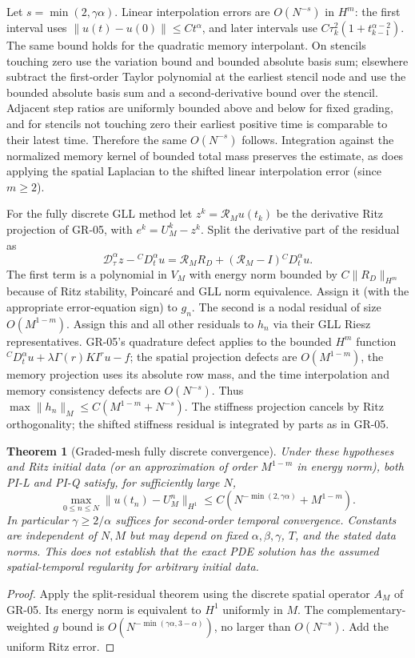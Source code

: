 \documentclass[11pt,a4paper]{article}
\newtheorem{theorem}{Theorem}
\newcommand{\norm}[1]{\lVert#1\rVert}
\newcommand{\D}{\mathcal D_\tau^\alpha}
\begin{document}
Let $s=\min(2,\gamma\alpha)$. Linear interpolation errors are $O(N^{-s})$ in $H^m$: the first interval uses $\norm{u(t)-u(0)}\le Ct^\alpha$, and later intervals use $C\tau_k^2(1+t_{k-1}^{\alpha-2})$. The same bound holds for the quadratic memory interpolant. On stencils touching zero use the variation bound and bounded absolute basis sum; elsewhere subtract the first-order Taylor polynomial at the earliest stencil node and use the bounded absolute basis sum and a second-derivative bound over the stencil. Adjacent step ratios are uniformly bounded above and below for fixed grading, and for stencils not touching zero their earliest positive time is comparable to their latest time. Therefore the same $O(N^{-s})$ follows. Integration against the normalized memory kernel of bounded total mass preserves the estimate, as does applying the spatial Laplacian to the shifted linear interpolation error (since $m\ge2$).

For the fully discrete GLL method let $z^k=\mathcal R_Mu(t_k)$ be the derivative Ritz projection of GR-05, with $e^k=U_M^k-z^k$. Split the derivative part of the residual as
\[
 \D z-{}^CD_t^\alpha u=\mathcal R_M R_D+(\mathcal R_M-I){}^CD_t^\alpha u.
\]
The first term is a polynomial in $V_M$ with energy norm bounded by $C\norm{R_D}_{H^m}$ because of Ritz stability, Poincar\'e and GLL norm equivalence. Assign it (with the appropriate error-equation sign) to $g_n$. The second is a nodal residual of size $O(M^{1-m})$. Assign this and all other residuals to $h_n$ via their GLL Riesz representatives. GR-05's quadrature defect applies to the bounded $H^m$ function ${}^CD_t^\alpha u+\lambda\Gamma(r)KI^ru-f$; the spatial projection defects are $O(M^{1-m})$, the memory projection uses its absolute row mass, and the time interpolation and memory consistency defects are $O(N^{-s})$. Thus $\max\norm{h_n}_M\le C(M^{1-m}+N^{-s})$. The stiffness projection cancels by Ritz orthogonality; the shifted stiffness residual is integrated by parts as in GR-05.
\begin{theorem}[Graded-mesh fully discrete convergence]
Under these hypotheses and Ritz initial data (or an approximation of order $M^{1-m}$ in energy norm), both PI-L and PI-Q satisfy, for sufficiently large $N$,
\[
 \max_{0\le n\le N}\norm{u(t_n)-U_M^n}_{H^1}\le C(N^{-\min(2,\gamma\alpha)}+M^{1-m}).
\]
In particular $\gamma\ge2/\alpha$ suffices for second-order temporal convergence. Constants are independent of $N,M$ but may depend on fixed $\alpha,\beta,\gamma$, $T$, and the stated data norms. This does not establish that the exact PDE solution has the assumed spatial-temporal regularity for arbitrary initial data.
\end{theorem}
\begin{proof}
Apply the split-residual theorem using the discrete spatial operator $A_M$ of GR-05. Its energy norm is equivalent to $H^1$ uniformly in $M$. The complementary-weighted $g$ bound is $O(N^{-\min(\gamma\alpha,3-\alpha)})$, no larger than $O(N^{-s})$. Add the uniform Ritz error. \qedhere
\end{proof}
\clearpage
\end{document}
